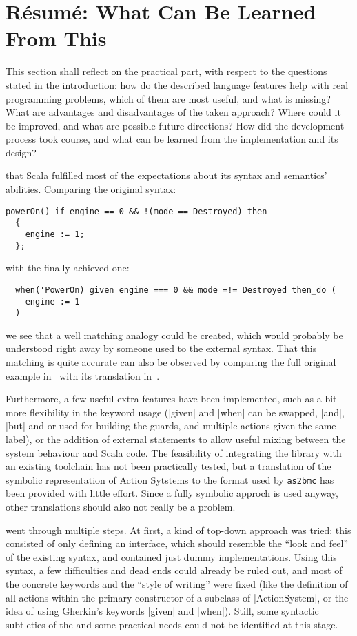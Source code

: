 \chapter{Résumé: What Can Be Learned From This}
\label{sec:resumee}

This section shall reflect on the practical part, with respect to the questions stated in the
introduction: how do the described language features help with real programming problems, which of
them are most useful, and what is missing? What are advantages and disadvantages of the taken
approach? Where could it be improved, and what are possible future directions? How did the
development process took course, and what can be learned from the implementation and its design?

 that Scala fulfilled most of the expectations about its
syntax and semantics' abilities. Comparing the original syntax:
\begin{lstlisting}[language={}]
  powerOn() if engine == 0 && !(mode == Destroyed) then
  {
    engine := 1;
  };
\end{lstlisting}
with the finally achieved one:
\begin{lstlisting}
  when('PowerOn) given engine === 0 && mode =!= Destroyed then_do (
    engine := 1
  )
\end{lstlisting}
we see that a well matching analogy could be created, which would probably be understood right away
by someone used to the external syntax. That this matching is quite accurate can also be observed by
comparing the full original example in~ with its translation
in~.

Furthermore, a few useful extra features have been implemented, such as a bit more flexibility in
the keyword usage (|given| and |when| can be swapped, |and|, |but| and or used for building the
guards, and multiple actions given the same label), or the addition of external statements to allow
useful mixing between the system behaviour and Scala code. The feasibility of integrating the
library with an existing toolchain has not been practically tested, but a translation of the
symbolic representation of \actium{} Action Sytstems to the format used by \texttt{as2bmc} has been
provided with little effort. Since a fully symbolic approch is used anyway, other translations
should also not really be a problem. 

 went through multiple steps. At first, a kind of
top-down approach was tried: this consisted of only defining an interface, which should resemble the
\enquote{look and feel} of the existing syntax, and contained just dummy implementations. Using this
syntax, a few difficulties and dead ends could already be ruled out, and most of the concrete
keywords and the \enquote{style of writing} were fixed (like the definition of all actions within
the primary constructor of a subclass of |ActionSystem|, or the idea of using Gherkin's keywords
|given| and |when|). Still, some syntactic subtleties of the \dsl{} and some practical needs could
not be identified at this stage.

